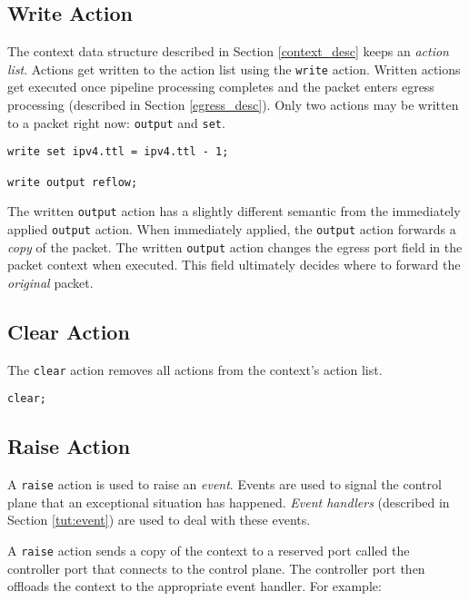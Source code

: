 \subsection{Write Action} \label{tut:write_action}

The context data structure described in Section \ref{context_desc} keeps an
\textit{action list}. Actions get written to the action list using the
\texttt{write} action. Written actions get executed once pipeline processing
completes and the packet enters egress processing (described in Section \ref{egress_desc}).
Only two actions may be written to a packet right now: \texttt{output} and \texttt{set}.

\begin{lstlisting}
write set ipv4.ttl = ipv4.ttl - 1;

write output reflow;
\end{lstlisting}

The written \texttt{output} action has a slightly different semantic from the immediately
applied \texttt{output} action. When immediately applied, the \texttt{output} action forwards a
\textit{copy} of the packet. The written \texttt{output} action changes the egress port field
in the packet context when executed. This field ultimately decides where to forward the
\textit{original} packet.

\subsection{Clear Action} \label{tut:clear_action}

The \texttt{clear} action removes all actions from the context's action list.

\begin{lstlisting}
clear;
\end{lstlisting}

\subsection{Raise Action} \label{tut:raise_action}

A \texttt{raise} action is used to raise an \textit{event}. Events are used to
signal the control plane that an exceptional situation has happened.
\textit{Event handlers} (described in Section \ref{tut:event}) are used to
deal with these events.

A \texttt{raise} action sends a copy of the context to a reserved port called the controller port that connects to the control plane.
The controller port then offloads the context to the appropriate event handler.
For example:


